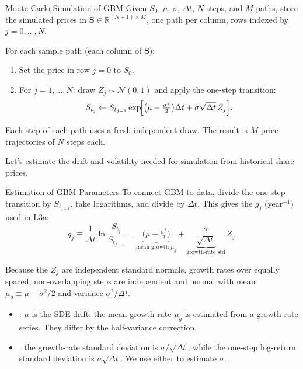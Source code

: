 \documentclass[aspectratio=169,11pt]{beamer}
\newcommand{\mug}{\mu_g}
\begin{document}
\begin{frame}{Monte Carlo Simulation of GBM}
  Given $S_0$, $\mu$, $\sigma$, $\Delta t$, $N$ steps, and $M$ paths, store the
  simulated prices in $\mathbf{S}\in\mathbb{R}^{(N+1)\times M}$, one path per
  column, rows indexed by $j=0,\ldots,N$.

  \vspace{0.5em}
  For each sample path (each column of $\mathbf{S}$):
  \begin{enumerate}\setlength{\itemsep}{0.45em}
    \item Set the price in row $j=0$ to $S_0$.
    \item For $j=1,\ldots,N$: draw $Z_j\sim\mathcal{N}(0,1)$ and apply the
      one-step transition:
      \[
        S_{t_j}\gets S_{t_{j-1}}\exp\!\Bigl[
          \bigl(\mu-\tfrac{\sigma^2}{2}\bigr)\Delta t
          +\sigma\sqrt{\Delta t}\,Z_j\Bigr].
      \]
  \end{enumerate}

  \vspace{0.3em}
  Each step of each path uses a fresh independent draw.
  The result is $M$ price trajectories of $N$ steps each.

  \vspace{0.4em}
  Let's estimate the drift and volatility needed for simulation from
  historical share prices.
\end{frame}

\begin{frame}{Estimation of GBM Parameters}
  To connect GBM to data, divide the one-step transition by
  $S_{t_{j-1}}$, take logarithms, and divide by $\Delta t$. This gives the
   $g_j$ (year$^{-1}$) used in L3a:
  \[
    \boxed{g_j\equiv\frac{1}{\Delta t}\ln\frac{S_{t_j}}{S_{t_{j-1}}}
    =\underbrace{\bigl(\mu-\tfrac{\sigma^2}{2}\bigr)}_{\text{mean growth }\mug}
    +\underbrace{\frac{\sigma}{\sqrt{\Delta t}}}_{\text{growth-rate std}}\,Z_j.}
  \]

  Because the $Z_j$ are independent standard normals, growth rates over equally
  spaced, non-overlapping steps are independent and normal with mean
  $\mug\equiv\mu-\sigma^2/2$ and variance $\sigma^2/\Delta t$.

  \vspace{0.3em}
  \begin{itemize}\setlength{\itemsep}{0.4em}
    \item {}: $\mu$ is the SDE drift; the mean growth
      rate $\mug$ is estimated from a growth-rate series. They differ by the
      half-variance correction.
    \item {}: the growth-rate standard deviation
      is $\sigma/\sqrt{\Delta t}$, while the one-step log-return standard
      deviation is $\sigma\sqrt{\Delta t}$. We use either to estimate $\sigma$.
  \end{itemize}
\end{frame}
\end{document}

